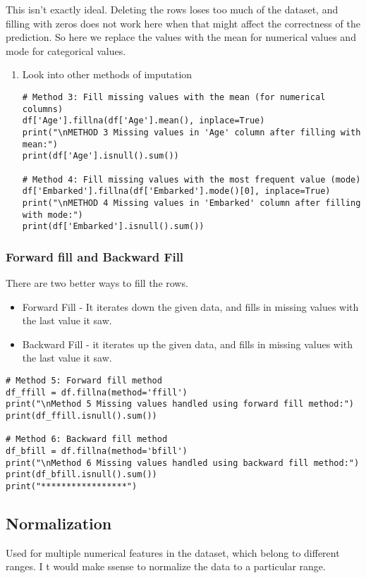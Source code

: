 \documentclass[11pt]{article}
\begin{document}
This isn't exactly ideal. Deleting the rows loses too  much of the dataset, and filling with zeros does not work here when that might affect the correctness of the prediction.
So here we replace the values with the mean for numerical values and mode for categorical values.
\begin{enumerate}
\item Look into other methods of imputation
\label{sec:orgb0cb548}
\begin{verbatim}
# Method 3: Fill missing values with the mean (for numerical columns)
df['Age'].fillna(df['Age'].mean(), inplace=True)
print("\nMETHOD 3 Missing values in 'Age' column after filling with mean:")
print(df['Age'].isnull().sum())

# Method 4: Fill missing values with the most frequent value (mode)
df['Embarked'].fillna(df['Embarked'].mode()[0], inplace=True)
print("\nMETHOD 4 Missing values in 'Embarked' column after filling with mode:")
print(df['Embarked'].isnull().sum())
\end{verbatim}
\end{enumerate}
\subsubsection{Forward fill and Backward Fill}
\label{sec:orgf9f12b1}
There are two better ways to fill the rows.
\begin{itemize}
\item Forward Fill - It iterates down the given data, and fills in missing values with the last value it saw.
\item Backward Fill - it iterates up the given data, and fills in missing values with the last value it saw.
\end{itemize}
\begin{verbatim}
# Method 5: Forward fill method
df_ffill = df.fillna(method='ffill')
print("\nMethod 5 Missing values handled using forward fill method:")
print(df_ffill.isnull().sum())

# Method 6: Backward fill method
df_bfill = df.fillna(method='bfill')
print("\nMethod 6 Missing values handled using backward fill method:")
print(df_bfill.isnull().sum())
print("*****************")
\end{verbatim}
\subsection{Normalization}
\label{sec:org4820ea5}
Used for multiple numerical features in the dataset, which belong to different ranges. I t would make ssense to normalize the data to a particular range.
\end{document}
